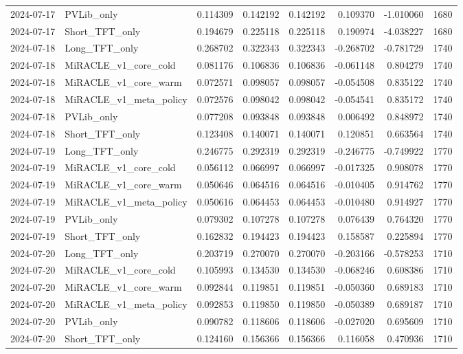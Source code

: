 \begin{tabular}{llrrrrrr}
2024-07-17 & PVLib_only & 0.114309 & 0.142192 & 0.142192 & 0.109370 & -1.010060 & 1680 \\
2024-07-17 & Short_TFT_only & 0.194679 & 0.225118 & 0.225118 & 0.190974 & -4.038227 & 1680 \\
2024-07-18 & Long_TFT_only & 0.268702 & 0.322343 & 0.322343 & -0.268702 & -0.781729 & 1740 \\
2024-07-18 & MiRACLE_v1_core_cold & 0.081176 & 0.106836 & 0.106836 & -0.061148 & 0.804279 & 1740 \\
2024-07-18 & MiRACLE_v1_core_warm & 0.072571 & 0.098057 & 0.098057 & -0.054508 & 0.835122 & 1740 \\
2024-07-18 & MiRACLE_v1_meta_policy & 0.072576 & 0.098042 & 0.098042 & -0.054541 & 0.835172 & 1740 \\
2024-07-18 & PVLib_only & 0.077208 & 0.093848 & 0.093848 & 0.006492 & 0.848972 & 1740 \\
2024-07-18 & Short_TFT_only & 0.123408 & 0.140071 & 0.140071 & 0.120851 & 0.663564 & 1740 \\
2024-07-19 & Long_TFT_only & 0.246775 & 0.292319 & 0.292319 & -0.246775 & -0.749922 & 1770 \\
2024-07-19 & MiRACLE_v1_core_cold & 0.056112 & 0.066997 & 0.066997 & -0.017325 & 0.908078 & 1770 \\
2024-07-19 & MiRACLE_v1_core_warm & 0.050646 & 0.064516 & 0.064516 & -0.010405 & 0.914762 & 1770 \\
2024-07-19 & MiRACLE_v1_meta_policy & 0.050616 & 0.064453 & 0.064453 & -0.010480 & 0.914927 & 1770 \\
2024-07-19 & PVLib_only & 0.079302 & 0.107278 & 0.107278 & 0.076439 & 0.764320 & 1770 \\
2024-07-19 & Short_TFT_only & 0.162832 & 0.194423 & 0.194423 & 0.158587 & 0.225894 & 1770 \\
2024-07-20 & Long_TFT_only & 0.203719 & 0.270070 & 0.270070 & -0.203166 & -0.578253 & 1710 \\
2024-07-20 & MiRACLE_v1_core_cold & 0.105993 & 0.134530 & 0.134530 & -0.068246 & 0.608386 & 1710 \\
2024-07-20 & MiRACLE_v1_core_warm & 0.092844 & 0.119851 & 0.119851 & -0.050360 & 0.689183 & 1710 \\
2024-07-20 & MiRACLE_v1_meta_policy & 0.092853 & 0.119850 & 0.119850 & -0.050389 & 0.689187 & 1710 \\
2024-07-20 & PVLib_only & 0.090782 & 0.118606 & 0.118606 & -0.027020 & 0.695609 & 1710 \\
2024-07-20 & Short_TFT_only & 0.124160 & 0.156366 & 0.156366 & 0.116058 & 0.470936 & 1710 \\

\end{tabular}
